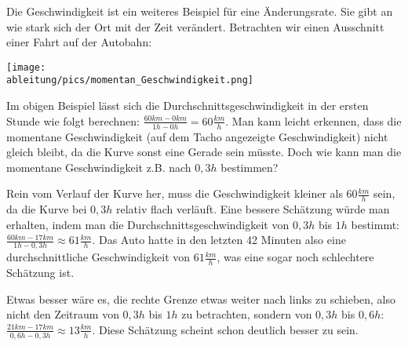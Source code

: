 Die Geschwindigkeit ist ein weiteres Beispiel für eine Änderungsrate. Sie gibt an wie stark sich der Ort mit der Zeit verändert. Betrachten wir einen Ausschnitt einer Fahrt auf der Autobahn:

\smallskip

\begin{minipage}[t]{\textwidth}
	\centering\texttt{[image: \\ableitung/pics/momentan\_Geschwindigkeit.png]}
\end{minipage}

Im obigen Beispiel lässt sich die Durchschnittsgeschwindigkeit in der ersten Stunde wie folgt berechnen: \(\frac{60km-0km}{1h-0h}=60\frac{km}{h}\). Man kann leicht erkennen, dass die momentane Geschwindigkeit (auf dem Tacho angezeigte Geschwindigkeit) nicht gleich bleibt, da die Kurve sonst eine Gerade sein müsste. Doch wie kann man die momentane Geschwindigkeit z.B. nach \(0,3h\) bestimmen?

Rein vom Verlauf der Kurve her, muss die Geschwindigkeit kleiner als \(60\frac{km}{h}\) sein, da die Kurve bei \(0,3h\) relativ flach verläuft. Eine bessere Schätzung würde man erhalten, indem man die Durchschnittsgeschwindigkeit von \(0,3h\) bis \(1h\) bestimmt: \(\frac{60km-17km}{1h-0,3h}\approx61\frac{km}{h}\). Das Auto hatte in den letzten 42 Minuten also eine durchschnittliche Geschwindigkeit von \(61\frac{km}{h}\), was eine sogar noch schlechtere Schätzung ist.

Etwas besser wäre es, die rechte Grenze etwas weiter nach links zu schieben, also nicht den Zeitraum von \(0,3h\) bis \(1h\) zu betrachten, sondern von \(0,3h\) bis \(0,6h\): \(\frac{21km-17km}{0,6h-0,3h}\approx13\frac{km}{h}\). Diese Schätzung scheint schon deutlich besser zu sein.

